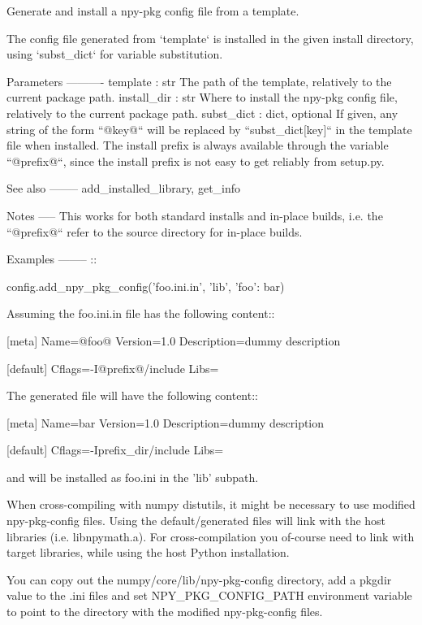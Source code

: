 \begin{DoxyVerb}Generate and install a npy-pkg config file from a template.

The config file generated from `template` is installed in the
given install directory, using `subst_dict` for variable substitution.

Parameters
----------
template : str
    The path of the template, relatively to the current package path.
install_dir : str
    Where to install the npy-pkg config file, relatively to the current
    package path.
subst_dict : dict, optional
    If given, any string of the form ``@key@`` will be replaced by
    ``subst_dict[key]`` in the template file when installed. The install
    prefix is always available through the variable ``@prefix@``, since the
    install prefix is not easy to get reliably from setup.py.

See also
--------
add_installed_library, get_info

Notes
-----
This works for both standard installs and in-place builds, i.e. the
``@prefix@`` refer to the source directory for in-place builds.

Examples
--------
::

    config.add_npy_pkg_config('foo.ini.in', 'lib', {'foo': bar})

Assuming the foo.ini.in file has the following content::

    [meta]
    Name=@foo@
    Version=1.0
    Description=dummy description

    [default]
    Cflags=-I@prefix@/include
    Libs=

The generated file will have the following content::

    [meta]
    Name=bar
    Version=1.0
    Description=dummy description

    [default]
    Cflags=-Iprefix_dir/include
    Libs=

and will be installed as foo.ini in the 'lib' subpath.

When cross-compiling with numpy distutils, it might be necessary to
use modified npy-pkg-config files.  Using the default/generated files
will link with the host libraries (i.e. libnpymath.a).  For
cross-compilation you of-course need to link with target libraries,
while using the host Python installation.

You can copy out the numpy/core/lib/npy-pkg-config directory, add a
pkgdir value to the .ini files and set NPY_PKG_CONFIG_PATH environment
variable to point to the directory with the modified npy-pkg-config
files.


\end{DoxyVerb}
